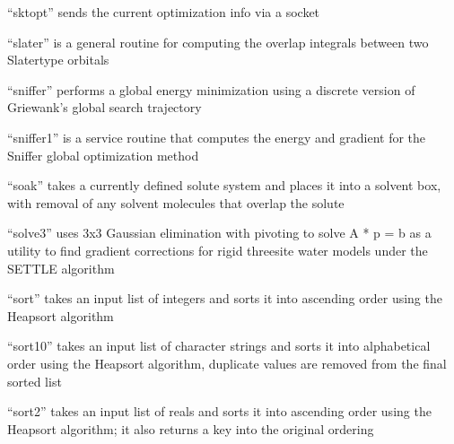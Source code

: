 \documentclass[letterpaper,11pt,english]{sphinxmanual}
\begin{document}
\sphinxAtStartPar
{}

\sphinxAtStartPar
“sktopt” sends the current optimization info via a socket

\sphinxAtStartPar
{}

\sphinxAtStartPar
“slater” is a general routine for computing the overlap integrals between two Slater\sphinxhyphen{}type orbitals

\sphinxAtStartPar
{}

\sphinxAtStartPar
“sniffer” performs a global energy minimization using a discrete version of Griewank’s global search trajectory

\sphinxAtStartPar
{}

\sphinxAtStartPar
“sniffer1” is a service routine that computes the energy and gradient for the Sniffer global optimization method

\sphinxAtStartPar
{}

\sphinxAtStartPar
“soak” takes a currently defined solute system and places it into a solvent box, with removal of any solvent molecules that overlap the solute

\sphinxAtStartPar
{}

\sphinxAtStartPar
“solve3” uses 3x3 Gaussian elimination with pivoting to solve A * p = b as a utility to find gradient corrections for rigid three\sphinxhyphen{}site water models under the SETTLE algorithm

\sphinxAtStartPar
{}

\sphinxAtStartPar
“sort” takes an input list of integers and sorts it into ascending order using the Heapsort algorithm

\sphinxAtStartPar
{}

\sphinxAtStartPar
“sort10” takes an input list of character strings and sorts it into alphabetical order using the Heapsort algorithm, duplicate values are removed from the final sorted list

\sphinxAtStartPar
{}

\sphinxAtStartPar
“sort2” takes an input list of reals and sorts it into ascending order using the Heapsort algorithm; it also returns a key into the original ordering

\sphinxAtStartPar
{}
\end{document}
